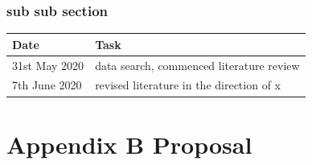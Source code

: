 \documentclass[
  12pt,
  oneside]{book}
\begin{document}
\subsection*{sub sub section}\label{sub-sub-section}

\begin{table}
\centering
\begin{tabular}{ll}
\toprule
\textbf{Date} & \textbf{Task}\\
\midrule
31st May 2020 & data search, commenced literature review\\
7th June 2020 & revised literature in the direction of x\\
\bottomrule
\end{tabular}
\end{table}

\chapter*{Appendix B Proposal}\label{appendix-b-proposal}

\enddocument

\printbibliography
\end{document}
